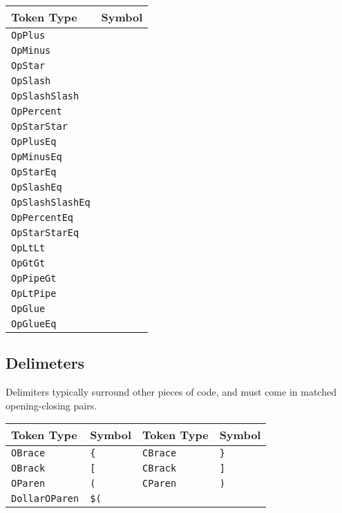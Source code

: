 \begin{table}[H]
{\begin{tabular}[t]{|ll|}
        \hline
        \textbf{Token Type} & \textbf{Symbol} \\
        \hline
        \texttt{OpPlus} & \op{+} \\
        \texttt{OpMinus} & \op{-} \\
        \texttt{OpStar} & \op{*} \\
        \texttt{OpSlash} & \op{/} \\
        \texttt{OpSlashSlash} & \op{//} \\
        \texttt{OpPercent} & \op{\%} \\
        \texttt{OpStarStar} & \op{**} \\
        \hline
        \texttt{OpPlusEq} & \op{+=} \\
        \texttt{OpMinusEq} & \op{-=} \\
        \texttt{OpStarEq} & \op{*=} \\
        \texttt{OpSlashEq} & \op{/=} \\
        \texttt{OpSlashSlashEq} & \op{//=} \\
        \texttt{OpPercentEq} & \op{\%=} \\
        \texttt{OpStarStarEq} & \op{**=} \\
        \hline
        \texttt{OpLtLt} & \op{<<} \\
        \texttt{OpGtGt} & \op{>>} \\
        \texttt{OpPipeGt} & \op{|>} \\
        \texttt{OpLtPipe} & \op{<|} \\
        \hline
        \texttt{OpGlue} & \op{<>} \\
        \texttt{OpGlueEq} & \op{<>=} \\
        \hline
    \end{tabular}
}
\end{table}

\subsection{Delimeters}

Delimiters typically surround other pieces of code, and must come in
matched opening-closing pairs.

\begin{table}[H]
    \centering
    \begin{tabular}[t]{|ll|ll|}
        \hline
        \textbf{Token Type} & \textbf{Symbol}& \textbf{Token Type} & \textbf{Symbol} \\
        \hline
        \texttt{OBrace} & \texttt{\{}& \texttt{CBrace} & \texttt{\}} \\
        \texttt{OBrack} & \texttt{[} & \texttt{CBrack} & \texttt{]} \\
        \texttt{OParen} & \texttt{(} & \texttt{CParen} & \texttt{)} \\
        \texttt{DollarOParen} & \texttt{\$(} & & \\
        \hline
    \end{tabular}
\end{table}

